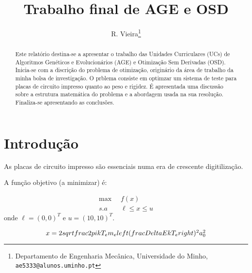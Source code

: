 \documentclass[a4paper,12pt]{article}
\begin{document}
%
\title{Trabalho final de AGE e OSD}


\author{R. Vieira\thanks{Departamento de Engenharia Mecânica, Universidade do Minho, {\tt ae5333@alunos.uminho.pt}}}

\maketitle              %

\begin{abstract}
Este relatório destina-se a apresentar o trabalho das Unidades Curriculares (UCs) de Algoritmos Genéticos e Evolucionários (AGE) e Otimização Sem Derivadas (OSD). Inicia-se com a discrição do problema de otimização, originário da área de trabalho da minha bolsa de investigação. O prblema consiste em optimzar um sistema de teste para placas de circuito impresso quanto ao peso e rigidez. É apresentada uma discussão sobre a estrutura matemática do problema e a abordagem usada na sua resolução. Finaliza-se apresentando as conclusões.
\end{abstract}

\section{Introdução}

As placas de circuito impresso são essenciais numa era de crescente digitilização.

A função objetivo (a minimizar) é:

\begin{equation}\label{eq:prob}
\begin{split}
\max\;\; &f(x)\\
s.a\;\; & \ell\leq x\leq u
\end{split}
\end{equation}
onde $\ell=(0,0)^T$ e $u=(10,10)^T$.


\begin{equation}\label{eq:fo}
$$x=2\\sqrt{\\frac{2\\pi k T_e}{m_e}} \\left(\\frac{\\Delta E}{k T_e}\\right)^2 a_0^2$$
\end{equation}
\end{document}
